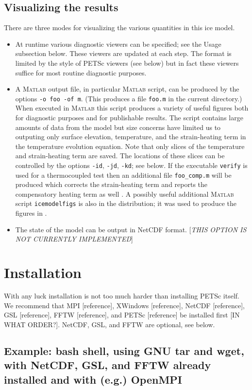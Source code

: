 \documentclass[final]{amsart}
\newcommand{\Matlab}{\textsc{Matlab}\xspace}
\begin{document}
\subsection{Visualizing the results}  There are three modes for visualizing the various quantities in this ice model.\begin{itemize}
\item At runtime various diagnostic viewers can be specified; see the Usage subsection below.  These viewers are updated at each step.  The format is limited by the style of PETSc viewers (see below) but in fact these viewers suffice for most routine diagnostic purposes.
\item A \Matlab output file, in particular \Matlab script, can be produced by the options \verb|-o foo -of m|.  (This produces a file \verb|foo.m| in the current directory.)  When executed in \Matlab this script produces a variety of useful figures both for diagnostic purposes and for publishable results.  The script contains large amounts of data from the model but size concerns have limited us to outputing only surface elevation, temperature, and the strain-heating term in the temperature evolution equation.  Note that only slices of the temperature and strain-heating term are saved.  The locations of these slices can be controlled by the options \verb|-id|, \verb|-jd|, \verb|-kd|; see below.  If the executable \verb|verify| is used for a thermocoupled test then an additional file \verb|foo_comp.m| will be produced which corrects the strain-heating term and reports the compensatory heating term as well \cite{BKL}.  A possibly useful additional \Matlab script \verb|icemodelfigs| is also in the distribution; it was used to produce the figures in \cite{BKL}.
\item The state of the model can be output in NetCDF format.  [\emph{THIS OPTION IS NOT CURRENTLY IMPLEMENTED}]
\end{itemize}


\section{Installation}

With any luck installation is not too much harder than installing PETSc itself.  We recommend that MPI [reference], XWindows [reference], NetCDF [reference], GSL [reference], FFTW [reference], and PETSc [reference] be installed first [IN WHAT ORDER?].  NetCDF, GSL, and FFTW are optional, see below.

\subsection{Example: bash shell, using GNU tar and wget, with NetCDF, GSL, and FFTW already installed and with (e.g.) OpenMPI}
\end{document}
